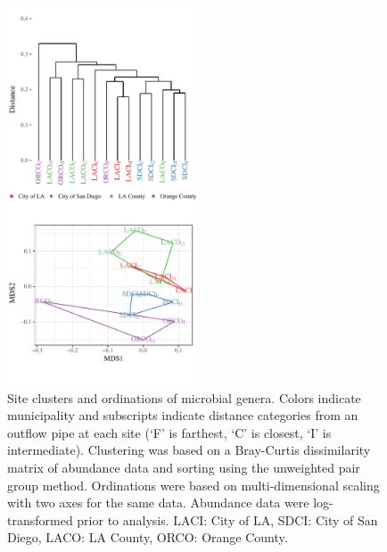 \documentclass[letterpaper,12pt]{article}\usepackage[]{graphicx}\usepackage[]{color}
\newenvironment{knitrout}{}{} %
\begin{document}
\begin{knitrout}
\color{fgcolor}\begin{figure}[!ht]

{\centering \includegraphics[width=0.5\textwidth]{figs/clust1_arch} 

}

\caption[Site clusters and ordinations of microbial genera]{Site clusters and ordinations of microbial genera.  Colors indicate municipality and subscripts indicate distance categories from an outflow pipe at each site (`F' is farthest, `C' is closest, `I' is intermediate).  Clustering was based on a Bray-Curtis dissimilarity matrix of abundance data and sorting using the unweighted pair group method.  Ordinations were based on multi-dimensional scaling with two axes for the same data.  Abundance data were log-transformed prior to analysis. LACI: City of LA, SDCI: City of San Diego, LACO: LA County, ORCO: Orange County.}\label{fig:clust1_arch}
\end{figure}


\end{knitrout}
\end{document}
